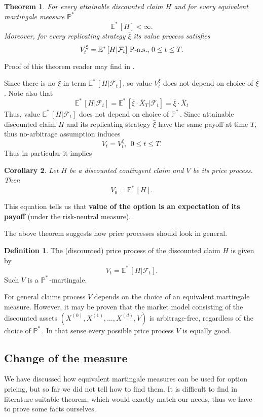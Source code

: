 \documentclass[a4paper,11pt, twoside]{book}
\newtheorem{thm}{Theorem}[chapter]
\newtheorem{coro}[thm]{Corollary}
\theoremstyle{definition}
\newtheorem{mydef}{Definition}[chapter]
\theoremstyle{remark}
\def\Em{{\mathbb{E}^*}\,}
\def\Pm{{\mathbb{P}}^*\,}
\def\Xa{\bar{X}}
\def\xia{\bar{\xi}}
\begin{document}
\begin{thm}
 For every attainable discounted claim $H$ and for every equivalent martingale measure $\Pm$
 \[ \Em [H] < \infty. \]
 Moreover, for every replicating strategy $\xia$ its value process satisfies
 \begin{equation}
  V^\xi_t = \Em[H | \mathcal{F}_t] \hbox{ P-a.s., } 0 \leq t \leq T .
 \end{equation}
\end{thm}
Proof of this theorem reader may find in \cite{follmer}.

Since there is no $\xia$ in term $\Em[H | \mathcal{F}_t]$, so value $V^\xi_t$ does not depend on choice of $\xia$. Note also that
\begin{equation*}
 \Em[H | \mathcal{F}_t]  = \Em[\xia \cdot \Xa_T | \mathcal{F}_t]  = \xia \cdot \Xa_t
\end{equation*}
Thus, value $\Em[H | \mathcal{F}_t]$ does not depend on choice of $\Pm$. 
Since attainable discounted claim $H$ and its replicating strategy $\xia$ have the same payoff at time $T$, thus no-arbitrage assumption induces
\[ V_t = V^\xi_t,\ \ 0 \leq t \leq T. \]
Thus in particular it implies
\begin{coro}
\label{coro:price_mth}
Let $H$ be a discounted contingent claim and $V$ be its price process. Then
\begin{equation}
 \label{eq:price_mtg}
 V_0 = \Em[H].
\end{equation}
\end{coro}
\noindent This equation tells us that \textbf{value of the option is an expectation of its payoff} (under the risk-neutral measure).

The above theorem suggests how price processes should look in general.
\begin{mydef}
 The (discounted) price process of the discounted claim $H$ is given by
 \begin{equation*}
  V_t = \Em[H | \mathcal{F}_t].
 \end{equation*}
 Such $V$ is a $\Pm$-martingale.
\end{mydef}
For general claims process $V$ depends on the choice of an equivalent martingale measure. However, it may be proven that the market model consisting of the discounted assets $(X^{(0)}, X^{(1)},\ldots,X^{(d)}, V)$ is arbitrage-free, regardless of the choice of $\Pm$. In that sense every possible price process $V$ is equally good.

\subsection*{Change of the measure}
We have discussed how equivalent martingale measures can be used for option pricing, but so far we did not tell how to find them. It is difficult to find in literature suitable theorem, which would exactly match our needs, thus we have to prove some facts ourselves.
\end{document}
